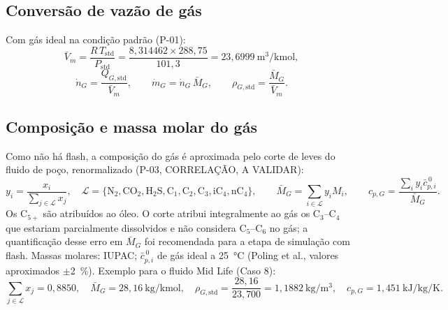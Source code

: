 \documentclass[11pt,a4paper]{article}
\numberwithin{equation}{section}
\numberwithin{table}{section}
\numberwithin{figure}{section}
\newcommand{\tipo}[1]{\textsf{\footnotesize #1}}
\newcommand{\AV}{\textcolor{red!70!black}{\tipo{A VALIDAR}}}
\begin{document}
\subsection{Conversão de vazão de gás}
Com gás ideal na condição padrão (P-01):
\begin{equation}\label{eq:vm}
\bar V_m = \frac{R\,T_{\mathrm{std}}}{P_{\mathrm{std}}} = \frac{8{,}314462\times 288{,}75}{101{,}3} = 23{,}6999\ \si{\cubic\metre\per\kilo\mole},
\end{equation}
\begin{equation}\label{eq:ngas}
\dot n_G = \frac{Q_{G,\mathrm{std}}}{\bar V_m},\qquad \dot m_G = \dot n_G\,\bar M_G,\qquad \rho_{G,\mathrm{std}}=\frac{\bar M_G}{\bar V_m}.
\end{equation}

\subsection{Composição e massa molar do gás}
Como não há flash, a composição do gás é aproximada pelo corte de leves do fluido de poço, renormalizado (P-03, \tipo{CORRELAÇÃO}, \AV):
\begin{equation}\label{eq:ygas}
y_i = \frac{x_i}{\sum_{j\in\mathcal L} x_j},\quad \mathcal L=\{\mathrm{N_2,CO_2,H_2S,C_1,C_2,C_3,iC_4,nC_4}\},\qquad \bar M_G=\sum_{i\in\mathcal L} y_i M_i,\qquad c_{p,G}=\frac{\sum_i y_i \bar c^{\,0}_{p,i}}{\bar M_G}.
\end{equation}
Os C$_{5+}$ são atribuídos ao óleo. O corte atribui integralmente ao gás os C$_3$--C$_4$ que estariam parcialmente dissolvidos e não considera C$_5$--C$_6$ no gás; a quantificação desse erro em $\bar M_G$ foi recomendada para a etapa de simulação com flash. Massas molares: IUPAC; $\bar c^{\,0}_{p,i}$ de gás ideal a 25~\si{\celsius} (Poling et al., valores aproximados $\pm$2~\%). Exemplo para o fluido Mid Life (Caso 8):
\begin{equation}
\sum_{j\in\mathcal L}x_j = 0{,}8850,\quad \bar M_G = 28{,}16\ \si{\kilogram\per\kilo\mole},\quad \rho_{G,\mathrm{std}}=\frac{28{,}16}{23{,}700}=1{,}1882\ \si{\kilogram\per\cubic\metre},\quad c_{p,G}=1{,}451\ \si{\kilo\joule\per\kilogram\per\kelvin}.
\end{equation}
\end{document}
